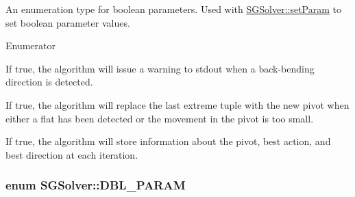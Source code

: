 An enumeration type for boolean parameters. Used with \hyperlink{class_s_g_solver_a7810a9f3d48d3eb7220154274dd39053}{S\+G\+Solver\+::set\+Param} to set boolean parameter values. \begin{Desc}
\item[Enumerator]\par
\begin{description}
\item[{\em 
\hypertarget{class_s_g_solver_a8de18768065063c3641acbb1b3fcd844a3dd1bfe7d9d0268d8d9807c8580745f3}{B\+A\+C\+K\+B\+E\+N\+D\+I\+N\+G\+W\+A\+R\+N\+I\+N\+G}\label{class_s_g_solver_a8de18768065063c3641acbb1b3fcd844a3dd1bfe7d9d0268d8d9807c8580745f3}
}]If true, the algorithm will issue a warning to stdout when a back-\/bending direction is detected. \item[{\em 
\hypertarget{class_s_g_solver_a8de18768065063c3641acbb1b3fcd844aafed85a93502e88e9d0edb743e859c75}{M\+E\+R\+G\+E\+T\+U\+P\+L\+E\+S}\label{class_s_g_solver_a8de18768065063c3641acbb1b3fcd844aafed85a93502e88e9d0edb743e859c75}
}]If true, the algorithm will replace the last extreme tuple with the new pivot when either a flat has been detected or the movement in the pivot is too small. \item[{\em 
\hypertarget{class_s_g_solver_a8de18768065063c3641acbb1b3fcd844a447d2987020b6414a437e635cc056f76}{S\+T\+O\+R\+E\+I\+T\+E\+R\+A\+T\+I\+O\+N\+S}\label{class_s_g_solver_a8de18768065063c3641acbb1b3fcd844a447d2987020b6414a437e635cc056f76}
}]If true, the algorithm will store information about the pivot, best action, and best direction at each iteration. \end{description}
\end{Desc}
\hypertarget{class_s_g_solver_a8c5a3d3ffb0b8344e24da63ea0b3e791}{
\subsubsection[{D\+B\+L\+\_\+\+P\+A\+R\+A\+M}]{\setlength{\rightskip}{0pt plus 5cm}enum {\bf S\+G\+Solver\+::\+D\+B\+L\+\_\+\+P\+A\+R\+A\+M}}}\label{class_s_g_solver_a8c5a3d3ffb0b8344e24da63ea0b3e791}


